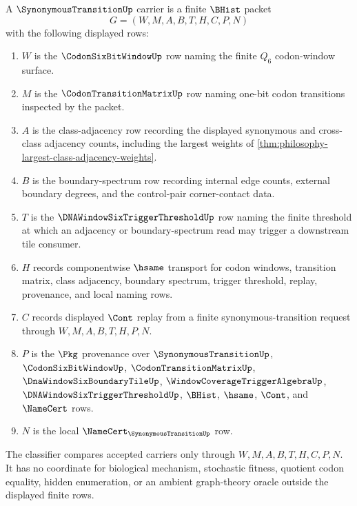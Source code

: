 \begin{definition}
\label{def:synonymous-transition-carrier}
A $\SynonymousTransitionUp$ carrier is a finite $\BHist$ packet
$$
G=(W,M,A,B,T,H,C,P,N)
$$
with the following displayed rows:
\begin{enumerate}
\item $W$ is the $\CodonSixBitWindowUp$ row naming the finite $Q_{6}$ codon-window surface.
\item $M$ is the $\CodonTransitionMatrixUp$ row naming one-bit codon transitions inspected by the packet.
\item $A$ is the class-adjacency row recording the displayed synonymous and cross-class adjacency counts, including the largest weights of \autoref{thm:philosophy-largest-class-adjacency-weights}.
\item $B$ is the boundary-spectrum row recording internal edge counts, external boundary degrees, and the control-pair corner-contact data.
\item $T$ is the $\DNAWindowSixTriggerThresholdUp$ row naming the finite threshold at which an adjacency or boundary-spectrum read may trigger a downstream tile consumer.
\item $H$ records componentwise $\hsame$ transport for codon windows, transition matrix, class adjacency, boundary spectrum, trigger threshold, replay, provenance, and local naming rows.
\item $C$ records displayed $\Cont$ replay from a finite synonymous-transition request through $W,M,A,B,T,H,P,N$.
\item $P$ is the $\Pkg$ provenance over $\SynonymousTransitionUp$, $\CodonSixBitWindowUp$, $\CodonTransitionMatrixUp$, $\DnaWindowSixBoundaryTileUp$, $\WindowCoverageTriggerAlgebraUp$, $\DNAWindowSixTriggerThresholdUp$, $\BHist$, $\hsame$, $\Cont$, and $\NameCert$ rows.
\item $N$ is the local $\NameCert_{\SynonymousTransitionUp}$ row.
\end{enumerate}
The classifier compares accepted carriers only through $W,M,A,B,T,H,C,P,N$. It has no coordinate for biological mechanism, stochastic fitness, quotient codon equality, hidden enumeration, or an ambient graph-theory oracle outside the displayed finite rows.
\end{definition}

